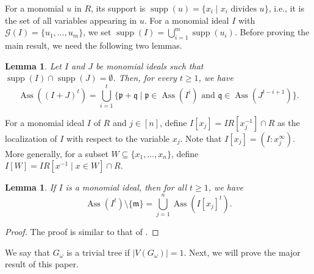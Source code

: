 \documentclass[12pt,amscd]{amsart}
\DeclareMathOperator{\supp}{supp}
\DeclareMathOperator{\ass}{Ass}
\newtheorem{lem}[thm]{Lemma}
\theoremstyle{definition}
\def\p {\mathfrak p}
\def\q {\mathfrak q}
\def\m {\mathfrak m}
\begin{document}
For a monomial $u$ in $R$, its support is $\supp(u) = \{ x_i\mid x_i \text{ divides } u \}$, i.e., it is the set of all variables appearing in $u$.
For a monomial ideal $I$ with $\mathcal{G}(I)=\{u_1,\ldots,u_m\}$, we set $\supp(I)=\bigcup\limits_{i=1}^{m}\supp(u_i)$.
Before proving the main result, we need the following  two  lemmas.

\begin{lem} \cite[Theorem 4.1]{HQ} \label{associated-primes} Let $I$ and $J$ be monomial ideals such that $\supp(I)\cap \supp(J) =\emptyset$. Then, for every $t\geqslant 1$, we have
$$\ass((I+J)^t) = \bigcup_{i=1}^t \{\p+\q\mid \p \in \ass(I^i) \text{ and } \q \in \ass(J^{t-i+1})\}.$$
\end{lem}


For a monomial ideal $I$ of $R$ and $j\in [n]$, define $I[x_j] = I R[x_j^{-1}] \cap R$ as the localization of $I$ with respect to the variable $x_j$. Note that $I[x_j] = (I : x_j^{\infty})$. More generally, for a subset $W\subseteq \{x_1,\ldots,x_n\}$, define $I[W] = IR[x^{-1}\mid x\in W] \cap R$.

\begin{lem}\label{local} If $I$ is a monomial ideal, then for all $t\geqslant 1$, we have
$$\ass(I^t) \setminus \{\m\} = \bigcup_{j=1}^n \ass(I[x_j]^t).$$
\end{lem}
\begin{proof} The proof is  similar to that of \cite[Lemma 11]{T}.
\end{proof}

We say  that  $G_\omega$ is a  trivial  tree if $|V(G_\omega)|=1$. Next, we will prove the major result of this paper.
\end{document}
